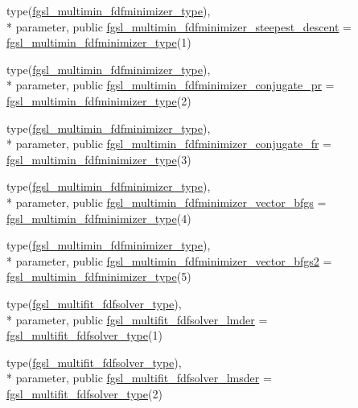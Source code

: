 \begin{DoxyCompactItemize}
\item 
type(\hyperlink{structfgsl_1_1fgsl__multimin__fdfminimizer__type}{fgsl\-\_\-multimin\-\_\-fdfminimizer\-\_\-type}), \\*
parameter, public \hyperlink{classfgsl_a30855ab98d924e9fa284bc2d50170b82}{fgsl\-\_\-multimin\-\_\-fdfminimizer\-\_\-steepest\-\_\-descent} = \hyperlink{structfgsl_1_1fgsl__multimin__fdfminimizer__type}{fgsl\-\_\-multimin\-\_\-fdfminimizer\-\_\-type}(1)
\item 
type(\hyperlink{structfgsl_1_1fgsl__multimin__fdfminimizer__type}{fgsl\-\_\-multimin\-\_\-fdfminimizer\-\_\-type}), \\*
parameter, public \hyperlink{classfgsl_a8ac392b0c99b65482d4a3f6a8f719ed6}{fgsl\-\_\-multimin\-\_\-fdfminimizer\-\_\-conjugate\-\_\-pr} = \hyperlink{structfgsl_1_1fgsl__multimin__fdfminimizer__type}{fgsl\-\_\-multimin\-\_\-fdfminimizer\-\_\-type}(2)
\item 
type(\hyperlink{structfgsl_1_1fgsl__multimin__fdfminimizer__type}{fgsl\-\_\-multimin\-\_\-fdfminimizer\-\_\-type}), \\*
parameter, public \hyperlink{classfgsl_a94fc756d777c9358f808374b01e6a879}{fgsl\-\_\-multimin\-\_\-fdfminimizer\-\_\-conjugate\-\_\-fr} = \hyperlink{structfgsl_1_1fgsl__multimin__fdfminimizer__type}{fgsl\-\_\-multimin\-\_\-fdfminimizer\-\_\-type}(3)
\item 
type(\hyperlink{structfgsl_1_1fgsl__multimin__fdfminimizer__type}{fgsl\-\_\-multimin\-\_\-fdfminimizer\-\_\-type}), \\*
parameter, public \hyperlink{classfgsl_a98f35d82aab613681b886c2582cb98d2}{fgsl\-\_\-multimin\-\_\-fdfminimizer\-\_\-vector\-\_\-bfgs} = \hyperlink{structfgsl_1_1fgsl__multimin__fdfminimizer__type}{fgsl\-\_\-multimin\-\_\-fdfminimizer\-\_\-type}(4)
\item 
type(\hyperlink{structfgsl_1_1fgsl__multimin__fdfminimizer__type}{fgsl\-\_\-multimin\-\_\-fdfminimizer\-\_\-type}), \\*
parameter, public \hyperlink{classfgsl_a6cc130b66b81b66a085cfb1882c711e6}{fgsl\-\_\-multimin\-\_\-fdfminimizer\-\_\-vector\-\_\-bfgs2} = \hyperlink{structfgsl_1_1fgsl__multimin__fdfminimizer__type}{fgsl\-\_\-multimin\-\_\-fdfminimizer\-\_\-type}(5)
\item 
type(\hyperlink{structfgsl_1_1fgsl__multifit__fdfsolver__type}{fgsl\-\_\-multifit\-\_\-fdfsolver\-\_\-type}), \\*
parameter, public \hyperlink{classfgsl_a8d1aeaeb6d1cc87ec0d79eddf44965b8}{fgsl\-\_\-multifit\-\_\-fdfsolver\-\_\-lmder} = \hyperlink{structfgsl_1_1fgsl__multifit__fdfsolver__type}{fgsl\-\_\-multifit\-\_\-fdfsolver\-\_\-type}(1)
\item 
type(\hyperlink{structfgsl_1_1fgsl__multifit__fdfsolver__type}{fgsl\-\_\-multifit\-\_\-fdfsolver\-\_\-type}), \\*
parameter, public \hyperlink{classfgsl_a24b9409272a5a9556e295c38502b6dbc}{fgsl\-\_\-multifit\-\_\-fdfsolver\-\_\-lmsder} = \hyperlink{structfgsl_1_1fgsl__multifit__fdfsolver__type}{fgsl\-\_\-multifit\-\_\-fdfsolver\-\_\-type}(2)
\end{DoxyCompactItemize}


